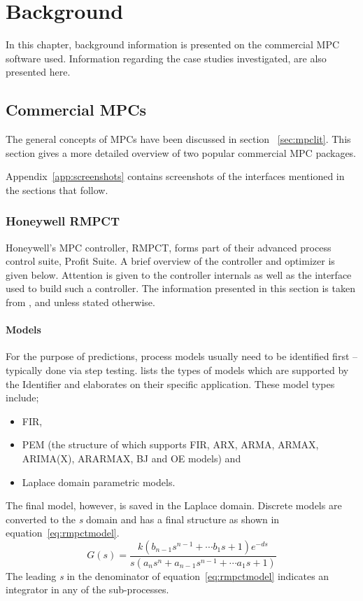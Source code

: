 \chapter{Background}\label{chap:background}
\begin{overview}
  In this chapter, background information is presented on the commercial MPC software used. 
  Information regarding the case studies investigated, are also presented here.
\end{overview}

\section{Commercial MPCs}\label{sec:commercialmpc}
The general concepts of MPCs have been discussed in section ~\ref{sec:mpclit}.
This section gives a more detailed overview of two popular commercial MPC packages.

Appendix~\ref{app:screenshots} contains screenshots of the interfaces mentioned in the sections that follow.

\subsection{Honeywell RMPCT}
Honeywell's MPC controller, RMPCT, forms part of their advanced process control suite, Profit Suite.
A brief overview of the controller and optimizer is given below. 
Attention is given to the controller internals as well as the interface used to build such a controller.
The information presented in this section is taken from \citet{honeywell1}, \citet{honeywell2} and \citet{honeywell3} unless stated otherwise.

\subsubsection{Models}
For the purpose of predictions, process models usually need to be identified first -- typically done via step testing.
\citet{honeywell3} lists the types of models which are supported by the Identifier and elaborates on their specific application.
These model types include;
\begin{itemize}
\item FIR,
\item PEM (the structure of which supports FIR, ARX, ARMA, ARMAX, ARIMA(X), ARARMAX, BJ and OE models) and
\item Laplace domain parametric models.
\end{itemize}
The final model, however, is saved in the Laplace domain.
Discrete models are converted to the {\it s} domain and has a final structure as shown in equation~\ref{eq:rmpctmodel}.
\begin{equation}
  \label{eq:rmpctmodel}
  G(s) = \frac{k(b_{n-1}s^{n-1}+ \cdots b_1s+1)e^{-ds}} {s(a_ns^n+a_{n-1}s^{n-1}+ \cdots a_1s+1)}
\end{equation}
The leading {\it s} in the denominator of equation~\ref{eq:rmpctmodel} indicates an integrator in any of the sub-processes.

